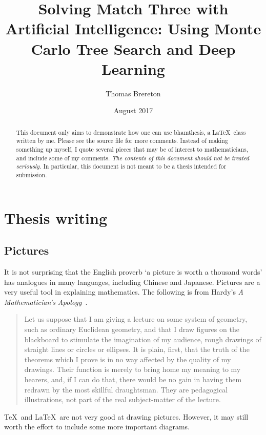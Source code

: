 \documentclass{bhamthesis}
\title{Solving Match Three with Artificial Intelligence: Using Monte Carlo Tree Search and Deep Learning}
\author{Thomas Brereton}
\date{August 2017}  %
\makeatletter
\theoremstyle{definition}
\newcommand{\clsname}{\textsf{bhamthesis}}
\newcommand{\bktitle}[1]{\textit{#1}}
\newcommand{\makecrestcover}{%
\begin{titlepage}
\centering\singlespacing
\vspace*{1cm}
{\huge\bfseries University of Birmingham\par}
\vspace*{2cm}
\texttt{[image: crest]}\par
\vspace*{\stretch{1}}
{\Huge\bfseries
\@author\par
\vspace{1cm}
\@title\par}
\vspace*{\stretch{1}}
{\Large\@date\par}
\end{titlepage}
}
\makeatother
\begin{document}
\frontmatter

\maketitle


\begin{abstract}
 This document only aims to demonstrate how one can use \clsname,
 a \LaTeX\ class written by me.  Please see the source file for
 more comments.  Instead of making something up myself, I quote
 several pieces that may be of interest to mathematicians, and
 include some of my comments. \emph{The contents of this document
 should not be treated seriously.}  In particular, this document
 is not meant to be a thesis intended for submission.
\end{abstract}

\tableofcontents


\mainmatter
\chapter{Thesis writing}
\section{Pictures}
It is not surprising that the English proverb `a picture is worth
a thousand words' has analogues in many languages, including
Chinese and Japanese.  Pictures are a very useful tool in
explaining mathematics.  The following is from Hardy's \bktitle{A
Mathematician's Apology}~\cite[\S23]{book:math-apol}.
\begin{quotation}
 Let us suppose that I am giving a lecture on some system of
 geometry, such as ordinary Euclidean geometry, and that I draw
 figures on the blackboard to stimulate the imagination of my
 audience, rough drawings of straight lines or circles or
 ellipses.  It is plain, first, that the truth of the theorems
 which I prove is in no way affected by the quality of my
 drawings.  Their function is merely to bring home my meaning
 to my hearers, and, if I can do that, there would be no gain in
 having them redrawn by the most skillful draughtsman.  They are
 pedagogical illustrations, not part of the real subject-matter
 of the lecture.
\end{quotation}
\TeX\ and \LaTeX\ are not very good at drawing pictures.  However,
it may still worth the effort to include some more important
diagrams.
\end{document}
